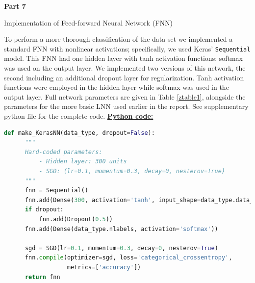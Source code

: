 \documentclass{article}
\begin{document}
\pagebreak
\begin{center}
\textbf{Part 7 }
\end{center}
\begin{biomathg}
\noindent Implementation of Feed-forward Neural Network (FNN)
\end{biomathg}
\vspace{0.5cm}
To perform a more thorough classification of the data set we implemented a standard FNN with nonlinear activations; specifically, we used Keras' \texttt{Sequential} model. This FNN had one hidden layer with tanh activation functions; softmax was used on the output layer. We implemented two versions of this network, the second including an additional dropout layer for regularization. Tanh activation functions were employed in the hidden layer while softmax was used in the output layer. Full network parameters are given in Table \ref{ztable1}, alongside the parameters for the more basic LNN used earlier in the report. See supplementary python file for the complete code.
\vspace{0.5cm}
\newline
\noindent \underline{\textbf{Python code:}} \\
\begin{biomathy}
\begin{lstlisting}[language=python]
  def make_KerasNN(data_type, dropout=False):
      """
      Hard-coded parameters:
          - Hidden layer: 300 units
          - SGD: (lr=0.1, momentum=0.3, decay=0, nesterov=True)
      """
      fnn = Sequential()
      fnn.add(Dense(300, activation='tanh', input_shape=data_type.data_shape))
      if dropout:
          fnn.add(Dropout(0.5))
      fnn.add(Dense(data_type.nlabels, activation='softmax'))

      sgd = SGD(lr=0.1, momentum=0.3, decay=0, nesterov=True)
      fnn.compile(optimizer=sgd, loss='categorical_crossentropy',
                  metrics=['accuracy'])
      return fnn
\end{lstlisting}
\end{biomathy}
\end{document}
